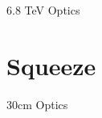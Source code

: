 \documentclass[11pt,usenames,dvipsnames]{beamer}
\begin{document}
\begin{frame}{6.8 TeV Optics}

\end{frame}

\section{Squeeze}

\begin{frame}{30cm Optics}
    
\end{frame}

\end{document}
